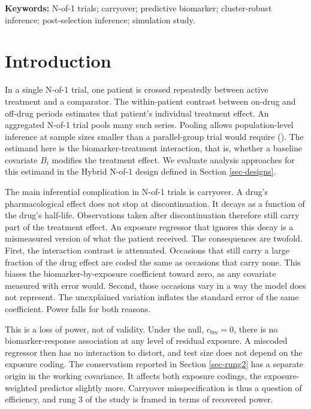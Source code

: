 \documentclass[
  11pt,
]{article}
\newcounter{none} %
\begin{document}
\textbf{Keywords:} N-of-1 trials; carryover; predictive biomarker;
cluster-robust inference; post-selection inference; simulation
study.

\section{Introduction}\label{introduction}

In a single N-of-1 trial, one patient is crossed repeatedly between
active treatment and a comparator. The within-patient contrast
between on-drug and off-drug periods estimates that patient's
individual treatment effect. An aggregated N-of-1 trial pools many
such series. Pooling allows population-level inference at sample
sizes smaller than a parallel-group trial would require
(). The estimand here is the biomarker-treatment
interaction, that is, whether a baseline covariate \(B_i\) modifies
the treatment effect. We evaluate analysis approaches for this
estimand in the Hybrid N-of-1 design defined in Section \ref{sec-designs}.

The main inferential complication in N-of-1 trials is carryover. A
drug's pharmacological effect does not stop at discontinuation. It
decays as a function of the drug's half-life. Observations taken
after discontinuation therefore still carry part of the treatment
effect. An exposure regressor that ignores this decay is a
mismeasured version of what the patient received. The consequences
are twofold. First, the interaction contrast is attenuated.
Occasions that still carry a large fraction of the drug effect are
coded the same as occasions that carry none. This biases the
biomarker-by-exposure coefficient toward zero, as any covariate
measured with error would. Second, those occasions vary in a way the
model does not represent. The unexplained variation inflates the
standard error of the same coefficient. Power falls for both
reasons.

This is a loss of power, not of validity. Under the null,
\(c_{bm} = 0\), there is no biomarker-response association at any
level of residual exposure. A miscoded regressor then has no
interaction to distort, and test size does not depend on the
exposure coding. The conservatism reported in Section
\ref{sec-rung2} has a separate origin in the working covariance. It
affects both exposure codings, the exposure-weighted predictor
slightly more. Carryover misspecification is thus a question of
efficiency, and rung 3 of the study is framed in terms of recovered
power.
\end{document}
